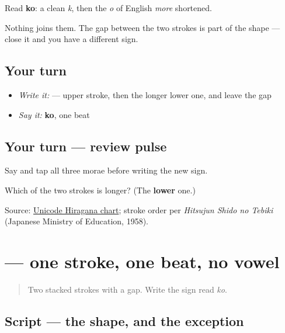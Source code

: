 Read \textbf{ko}: a clean \emph{k}, then the \emph{o} of English \emph{more} shortened.

Nothing joins them. The gap between the two strokes is part of the shape — close it and you have a different sign.

\subsection*{Your turn}
\begin{itemize}
\raggedright
  \item \emph{Write it:}  — upper stroke, then the longer lower one, and leave the gap
  \item \emph{Say it:} \textbf{ko}, one beat
\end{itemize}

\subsection*{Your turn — review pulse}
Say \textbf{} and tap all three morae before writing the new sign.

\begin{tcolorbox}[breakable,colback=teal!4,colframe=teal!35!black,title={Before you move on}]
Which of the two strokes is longer? (The \textbf{lower} one.)

Source: \href{https://www.unicode.org/charts/PDF/U3040.pdf}{Unicode Hiragana chart}; stroke order per \emph{Hitsujun Shido no Tebiki} (Japanese Ministry of Education, 1958).
\end{tcolorbox}
\section[\texorpdfstring{\ja{ん} (n)}{ん (n)}]{ — one stroke, one beat, no vowel}

\label{lesson:JA-W01-n}



\begin{quote}
Two stacked strokes with a gap. Write the sign read \emph{ko}.
\end{quote}

\subsection*{Script — the shape, and the exception}

\begin{quote}
\end{quote}

